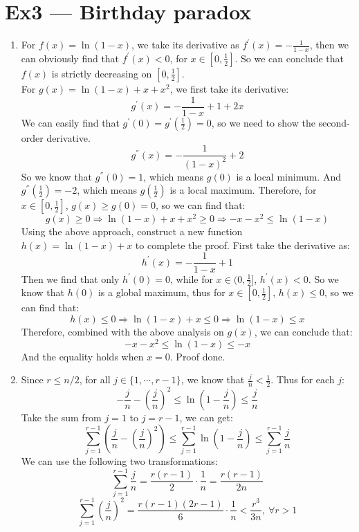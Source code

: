 \documentclass[12pt, a4paper]{article}
\begin{document}
\section*{Ex3 --- Birthday paradox}
\begin{enumerate}
    \item For $f(x) = \ln(1-x)$, we take its derivative as $f^\prime(x) = -\frac{1}{1-x}$, 
          then we can obviously find that $f^\prime(x) < 0$, for $x\in [0, \frac{1}{2}]$. 
          So we can conclude that $f(x)$ is strictly decreasing on $[0, \frac{1}{2}]$. \\
          For $g(x) = \ln(1-x)+x+x^2$, we first take its derivative:
          $$g^\prime(x) = -\frac{1}{1-x} + 1 + 2x$$
          We can easily find that $g^\prime(0) = g^\prime(\frac{1}{2}) = 0$, so we need to show the second-order derivative. 
          $$g^{''}(x) = -\frac{1}{(1-x)^2} + 2$$
          So we know that $g^{''}(0) = 1$, which means $g(0)$ is a local minimum. 
          And $g^{''}(\frac{1}{2}) = -2$, which means $g(\frac{1}{2})$ is a local maximum. 
          Therefore, for $x\in [0, \frac{1}{2}]$, $g(x) \geq g(0) = 0$, so we can find that:
          $$g(x) \geq 0 \Rightarrow \ln(1-x)+x+x^2 \geq 0 \Rightarrow -x-x^2 \leq \ln(1-x)$$
          Using the above approach, construct a new function $h(x) = \ln(1-x) + x$ to complete the proof. 
          First take the derivative as:
          $$h^\prime(x) = -\frac{1}{1-x} + 1$$
          Then we find that only $h^\prime(0) = 0$, while for $x\in (0, \frac{1}{2}]$, $h^\prime(x) < 0$. 
          So we know that $h(0)$ is a global maximum, thus for $x\in [0, \frac{1}{2}]$, $h(x) \leq 0$, so we can find that:
          $$h(x) \leq 0 \Rightarrow \ln(1-x) + x \leq 0 \Rightarrow \ln(1-x) \leq x$$
          Therefore, combined with the above analysis on $g(x)$, we can conclude that:
          $$-x - x^2 \leq \ln(1-x) \leq -x$$
          And the equality holds when $x = 0$. Proof done.
    \item Since $r \leq n/2$, for all $j\in \{1,\cdots,r-1\}$, we know that $\frac{j}{n} < \frac{1}{2}$. Thus for each $j$:
          $$-\frac{j}{n} - (\frac{j}{n})^2 \leq \ln(1 - \frac{j}{n}) \leq \frac{j}{n}$$
          Take the sum from $j = 1$ to $j = r - 1$, we can get:
          $$\sum_{j=1}^{r-1}(\frac{j}{n} - (\frac{j}{n})^2) \leq \sum_{j=1}^{r-1} \ln(1-\frac{j}{n}) \leq \sum_{j=1}^{r-1}\frac{j}{n}$$
          We can use the following two transformations:
          $$\sum_{j=1}^{r-1} \frac{j}{n} = \frac{r(r-1)}{2}\cdot \frac{1}{n} = \frac{r(r-1)}{2n}$$
          $$\sum_{j=1}^{r-1} (\frac{j}{n})^2 = \frac{r(r-1)(2r-1)}{6}\cdot \frac{1}{n} < \frac{r^3}{3n},\ \forall r>1$$

\end{enumerate}
\end{document}
